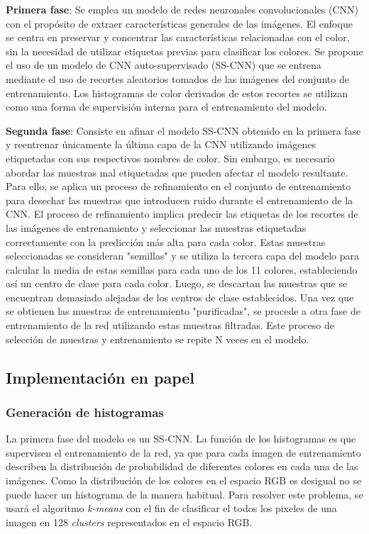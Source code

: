 \documentclass[14pt,a4paper]{report}
\begin{document}
\textbf{Primera fase}: Se emplea un modelo de redes neuronales convolucionales (CNN) con el propósito de extraer características generales de las imágenes. El enfoque se centra en preservar y concentrar las características relacionadas con el color, sin la necesidad de utilizar etiquetas previas para clasificar los colores. Se propone el uso de un modelo de CNN auto-supervisado (SS-CNN) que se entrena mediante el uso de recortes aleatorios tomados de las imágenes del conjunto de entrenamiento. Los histogramas de color derivados de estos recortes se utilizan como una forma de supervisión interna para el entrenamiento del modelo.

\textbf{Segunda fase}: Consiste en afinar el modelo SS-CNN obtenido en la primera fase y reentrenar únicamente la última capa de la CNN utilizando imágenes etiquetadas con sus respectivos nombres de color. Sin embargo, es necesario abordar las muestras mal etiquetadas que pueden afectar el modelo resultante. Para ello, se aplica un proceso de refinamiento en el conjunto de entrenamiento para desechar las muestras que introducen ruido durante el entrenamiento de la CNN. El proceso de refinamiento implica predecir las etiquetas de los recortes de las imágenes de entrenamiento y seleccionar las muestras etiquetadas correctamente con la predicción más alta para cada color. Estas muestras seleccionadas se consideran "semillas" y se utiliza la tercera capa del modelo para calcular la media de estas semillas para cada uno de los 11 colores, estableciendo así un centro de clase para cada color. Luego, se descartan las muestras que se encuentran demasiado alejadas de los centros de clase establecidos. Una vez que se obtienen las muestras de entrenamiento "purificadas", se procede a otra fase de entrenamiento de la red utilizando estas muestras filtradas. Este proceso de selección de muestras y entrenamiento se repite N veces en el modelo.

\subsection*{Implementación en papel}

\subsubsection*{Generación de histogramas}
La primera fase del modelo es un SS-CNN. La función de los histogramas es que supervisen el entrenamiento de la red, ya que para cada imagen de entrenamiento describen la distribución de probabilidad de diferentes colores en cada una de las imágenes. Como la distribución de los colores en el espacio RGB es desigual no se puede hacer un histograma de la manera habitual. Para resolver este problema, se usará el algoritmo \textit{k-means} con el fin de clasificar el todos  los pixeles de una imagen en 128 \textit{clusters} representados en el espacio RGB.
\end{document}
